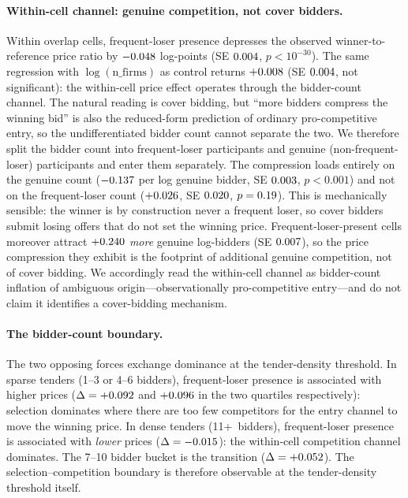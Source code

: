 \paragraph{Within-cell channel: genuine competition, not cover bidders.}
Within overlap cells, frequent-loser presence depresses the
observed winner-to-reference price ratio by
$-0.048$ log-points (SE $0.004$,
$p<10^{-30}$). The same regression with
$\log(\text{n\_firms})$ as control returns
$+0.008$ (SE $0.004$,
not significant): the within-cell price effect operates through
the bidder-count channel. The natural reading is cover bidding,
but ``more bidders compress the winning bid'' is also the
reduced-form prediction of ordinary pro-competitive entry, so the
undifferentiated bidder count cannot separate the two. We
therefore split the bidder count into frequent-loser participants
and genuine (non-frequent-loser) participants and enter them
separately. The compression loads entirely on the genuine count
($-0.137$ per log genuine bidder, SE $0.003$,
$p<0.001$) and not on the frequent-loser count ($+0.026$, SE
$0.020$, $p=0.19$). This is mechanically sensible: the
winner is by construction never a frequent loser, so cover
bidders submit losing offers that do not set the winning price.
Frequent-loser-present cells moreover attract
$+0.240$ \emph{more} genuine log-bidders (SE
$0.007$), so the price compression they exhibit is
the footprint of additional genuine competition, not of cover
bidding. We accordingly read the within-cell channel as
bidder-count inflation of ambiguous origin---observationally
pro-competitive entry---and do not claim it identifies a
cover-bidding mechanism.

\paragraph{The bidder-count boundary.}
The two opposing forces exchange dominance at the
tender-density threshold. In sparse tenders (1--3 or 4--6
bidders), frequent-loser presence is associated with higher
prices ($\Delta=+0.092$ and
$+0.096$ in the two quartiles respectively):
selection dominates where there are too few competitors for the
entry channel to move the winning price. In dense tenders
(11+~bidders), frequent-loser presence is associated with
\emph{lower} prices ($\Delta=-0.015$):
the within-cell competition channel dominates. The 7--10 bidder
bucket is the transition ($\Delta=+0.052$).
The selection--competition boundary is therefore observable at
the tender-density threshold itself.

